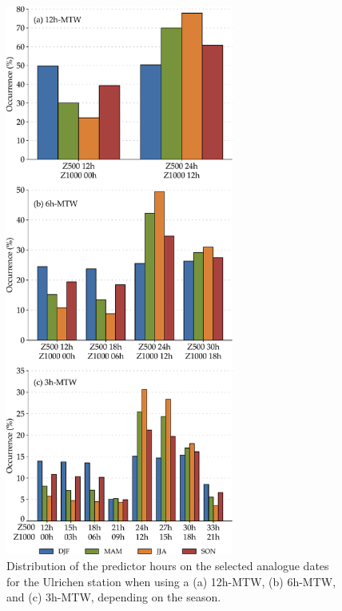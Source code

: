 \documentclass[hess, manuscript]{copernicus}
\begin{document}
	\begin{figure}[htb]
		\includegraphics[width=7.5cm]{fig07.pdf}
		\caption{Distribution of the predictor hours on the selected analogue dates for the Ulrichen station when using a (a) 12h-MTW, (b) 6h-MTW, and (c) 3h-MTW, depending on the season.}
		\label{fig:hours_selection_per_season}
	\end{figure}
	
\end{document}

